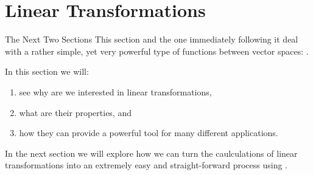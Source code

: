 \section{Linear Transformations}

\begin{summary}{The Next Two Sections}{}
	This section and the one immediately following it deal with a rather simple, yet very powerful type of functions between vector spaces: .

	In this section we will:
	\begin{enumerate}
		\item see why are we interested in linear transformations,
		\item what are their properties, and
		\item how they can provide a powerful tool for many different applications.
	\end{enumerate}

	In the next section we will explore how we can turn the caulculations of linear transformations into an extremely easy and straight-forward process using .
\end{summary}

